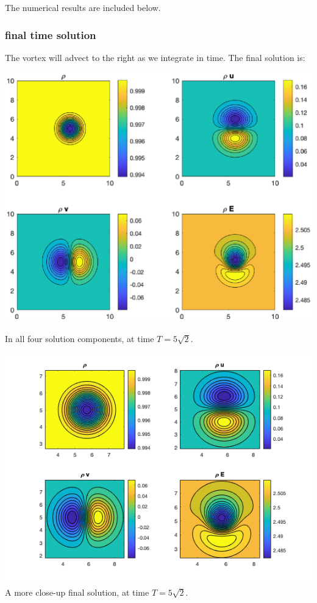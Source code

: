 \documentclass[12pt]{article}
\begin{document}
The numerical results are included below.
\subsubsection{final time solution}
The vortex will advect to the right as we integrate in time. The final solution is:

\includegraphics[width=1.0\textwidth]{final_sol_vortex.eps}


\indent \indent \indent \indent In all four solution components, at time $T = 5\sqrt{2}$.

\includegraphics[width=1.0\textwidth]{close-up.png}
\indent \indent \indent \indent A more close-up final solution, at time $T=5\sqrt{2}$.
\end{document}
